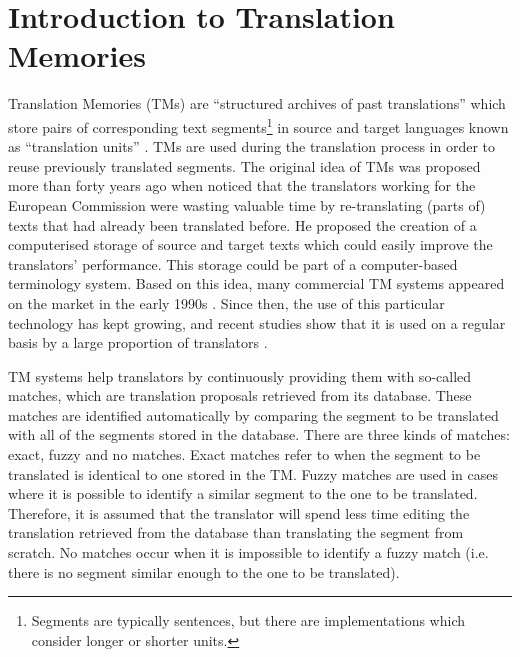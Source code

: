 \chapter{\label{cha:tm_introduction}Introduction to Translation Memories}

Translation Memories (TMs) are ``structured archives of past translations'' which store pairs of corresponding text segments\footnote{Segments are typically sentences, but there are implementations which consider longer or shorter units.} in source and target languages known as ``translation units'' \autocite{Simard2020}. TMs are used during the translation process in order to reuse previously translated segments. The original idea of TMs was proposed more than forty years ago when \textcite{Arthern1979} noticed that the translators working for the European Commission were wasting valuable time by re-translating (parts of) texts that had already been translated before. He proposed the creation of a computerised storage of source and target texts which could easily improve the translators' performance. This storage could be part of a computer-based terminology system. Based on this idea, many commercial TM systems appeared on the market in the early 1990s \autocite{bowker2006lexicography}. Since then, the use of this particular technology has kept growing, and recent studies show that it is used on a regular basis by a large proportion of translators  \autocite{zaretskaya:2018}.

TM systems help translators by continuously providing them with so-called matches, which are translation proposals retrieved from its database. These matches are identified automatically by comparing the segment to be translated with all of the segments stored in the database. There are three kinds of matches: exact, fuzzy and no matches. Exact matches refer to when the segment to be translated is identical to one stored in the TM. Fuzzy matches are used in cases where it is possible to identify a similar segment to the one to be translated. Therefore, it is assumed that the translator will spend less time editing the translation retrieved from the database than translating the segment from scratch. No matches occur when it is impossible to identify a fuzzy match (i.e. there is no segment similar enough to the one to be translated).


